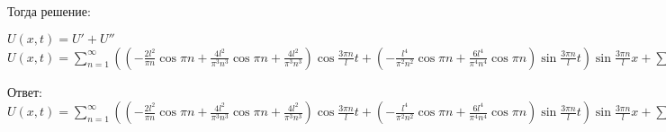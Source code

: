 \documentclass{article}
\begin{document}
    Тогда решение:
    \begin{center}
        $ U(x, t) = U' + U'' $ \\
        $ \displaystyle U(x, t) = \sum_{n = 1}^{\infty}((- \frac{2l^2}{\pi n}\cos \pi n + \frac{4l^2}{\pi^3 n^3}\cos \pi n + \frac{4l^2}{\pi^3 n^3}) \cos \frac{3\pi n}{l}t + (- \frac{l^4}{\pi^2 n^2}\cos \pi n + \frac{6 l^4}{\pi^4 n^4}\cos \pi n) \sin \frac{3\pi n}{l}t) \sin \frac{3\pi n}{l}x  + \sum_{n = 1}^{\infty}\frac{1}{n^3} ( 1 - \cos \pi n ) \sin \frac{\pi n}{l}x ( \cos \frac{3 \pi n}{l} t + 1 )  $
    \end{center}
    Ответ: $ \displaystyle U(x, t) = \sum_{n = 1}^{\infty}((- \frac{2l^2}{\pi n}\cos \pi n + \frac{4l^2}{\pi^3 n^3}\cos \pi n + \frac{4l^2}{\pi^3 n^3}) \cos \frac{3\pi n}{l}t + (- \frac{l^4}{\pi^2 n^2}\cos \pi n + \frac{6 l^4}{\pi^4 n^4}\cos \pi n) \sin \frac{3\pi n}{l}t) \sin \frac{3\pi n}{l}x + \sum_{n = 1}^{\infty}\frac{1}{n^3} ( 1 - \cos \pi n ) \sin \frac{\pi n}{l}x ( \cos \frac{3 \pi n}{l} t + 1 )  $

    \newpage
\end{document}
